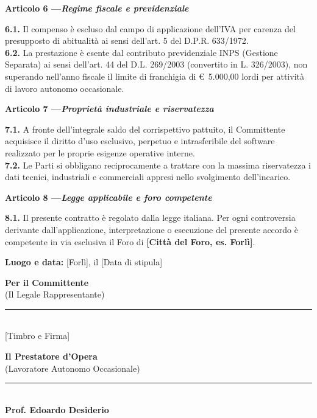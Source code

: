 \documentclass[11pt,a4paper]{article}
\newcommand{\articolo}[2]{%
  \vspace{0.8em}%
  {\noindent\bfseries Articolo #1 \quad---\quad \itshape #2}\par\vspace{0.2em}%
}
\begin{document}
\articolo{6}{Regime fiscale e previdenziale}
\textbf{6.1.} Il compenso è escluso dal campo di applicazione dell'IVA per carenza del presupposto di abitualità ai sensi dell'art. 5 del D.P.R. 633/1972.\\
\textbf{6.2.} La prestazione è esente dal contributo previdenziale INPS (Gestione Separata) ai sensi dell'art. 44 del D.L. 269/2003 (convertito in L. 326/2003), non superando nell'anno fiscale il limite di franchigia di \euro~5.000,00 lordi per attività di lavoro autonomo occasionale.

\articolo{7}{Proprietà industriale e riservatezza}
\textbf{7.1.} A fronte dell'integrale saldo del corrispettivo pattuito, il Committente acquisisce il diritto d'uso esclusivo, perpetuo e intrasferibile del software realizzato per le proprie esigenze operative interne.\\
\textbf{7.2.} Le Parti si obbligano reciprocamente a trattare con la massima riservatezza i dati tecnici, industriali e commerciali appresi nello svolgimento dell'incarico.

\articolo{8}{Legge applicabile e foro competente}
\textbf{8.1.} Il presente contratto è regolato dalla legge italiana. Per ogni controversia derivante dall'applicazione, interpretazione o esecuzione del presente accordo è competente in via esclusiva il Foro di \textbf{[Città del Foro, es. Forlì]}.

\vspace{1.5em}
\noindent
\textbf{Luogo e data:} [Forlì], il [Data di stipula]

\vspace{2.5em}

\noindent
\begin{minipage}[t]{0.48\textwidth}
  \centering
  \textbf{Per il Committente}\\
  {\footnotesize (Il Legale Rappresentante)}\\[3.5em]
  \rule{0.8\textwidth}{0.5pt}\\[0.3em]
  {\footnotesize [Timbro e Firma]}
\end{minipage}
\hfill
\begin{minipage}[t]{0.48\textwidth}
  \centering
  \textbf{Il Prestatore d'Opera}\\
  {\footnotesize (Lavoratore Autonomo Occasionale)}\\[3.5em]
  \rule{0.8\textwidth}{0.5pt}\\[0.3em]
  \textbf{Prof. Edoardo Desiderio}
\end{minipage}
\end{document}
